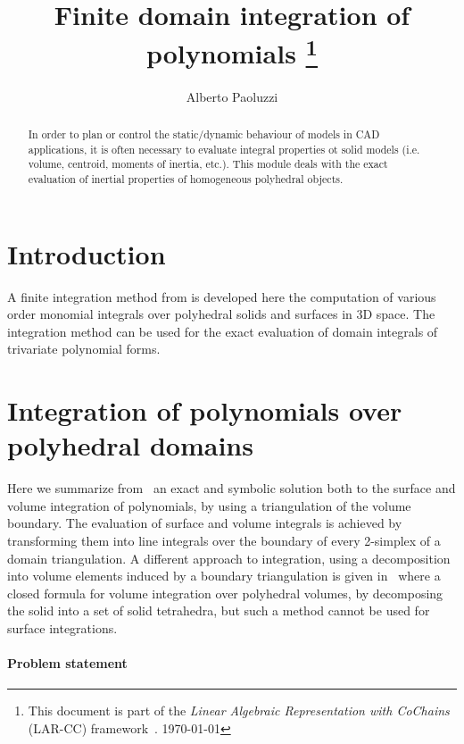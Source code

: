 \documentclass[11pt,oneside]{article}	%
\title{Finite domain integration of polynomials
\footnote{This document is part of the \emph{Linear Algebraic Representation with CoChains} (LAR-CC) framework~\cite{cclar-proj:2013:00}. \today}
}
\author{Alberto Paoluzzi}
\begin{document}
\maketitle
\nonstopmode

\begin{abstract}
In order to plan or control the static/dynamic behaviour of models in CAD applications, it is often necessary to evaluate integral properties ot solid models (i.e. volume, centroid, moments of inertia, etc.). This module deals with the exact evaluation of inertial properties of homogeneous polyhedral objects. 
\end{abstract}

\tableofcontents

\section{Introduction}

A finite integration method from\cite{CattaniP-BIL1990} is developed here the computation of various order monomial integrals over polyhedral solids and surfaces in 3D space. The integration method can be used for the exact evaluation of domain integrals of trivariate polynomial forms.


\section{Integration of polynomials over polyhedral domains}
\label{sec:cattani}

Here we summarize from~\cite{CattaniP-BIL1990} an exact and symbolic solution
both to the surface and volume integration of polynomials, by using a
triangulation of the volume boundary.   The evaluation of
surface and volume integrals is achieved by transforming them into line
integrals over the boundary of every 2-simplex of a domain
triangulation.  A different approach to integration, using a
decomposition into volume elements induced by a boundary triangulation
is given in~\cite{Kajiya:84} where a closed formula for volume
integration over polyhedral volumes, by decomposing the solid into a set
of solid tetrahedra, but such a method cannot be used for surface
integrations.


\paragraph{Problem statement}
\end{document}
